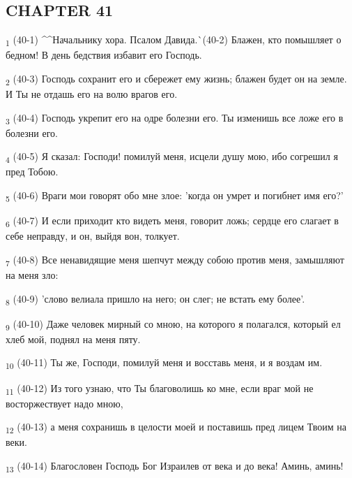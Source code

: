 \subsection{CHAPTER 41}
\begin{tcolorbox}
\textsubscript{1} (40-1) ^^Начальнику хора. Псалом Давида.^^ (40-2) Блажен, кто помышляет о бедном! В день бедствия избавит его Господь.
\end{tcolorbox}
\begin{tcolorbox}
\textsubscript{2} (40-3) Господь сохранит его и сбережет ему жизнь; блажен будет он на земле. И Ты не отдашь его на волю врагов его.
\end{tcolorbox}
\begin{tcolorbox}
\textsubscript{3} (40-4) Господь укрепит его на одре болезни его. Ты изменишь все ложе его в болезни его.
\end{tcolorbox}
\begin{tcolorbox}
\textsubscript{4} (40-5) Я сказал: Господи! помилуй меня, исцели душу мою, ибо согрешил я пред Тобою.
\end{tcolorbox}
\begin{tcolorbox}
\textsubscript{5} (40-6) Враги мои говорят обо мне злое: 'когда он умрет и погибнет имя его?'
\end{tcolorbox}
\begin{tcolorbox}
\textsubscript{6} (40-7) И если приходит кто видеть меня, говорит ложь; сердце его слагает в себе неправду, и он, выйдя вон, толкует.
\end{tcolorbox}
\begin{tcolorbox}
\textsubscript{7} (40-8) Все ненавидящие меня шепчут между собою против меня, замышляют на меня зло:
\end{tcolorbox}
\begin{tcolorbox}
\textsubscript{8} (40-9) 'слово велиала пришло на него; он слег; не встать ему более'.
\end{tcolorbox}
\begin{tcolorbox}
\textsubscript{9} (40-10) Даже человек мирный со мною, на которого я полагался, который ел хлеб мой, поднял на меня пяту.
\end{tcolorbox}
\begin{tcolorbox}
\textsubscript{10} (40-11) Ты же, Господи, помилуй меня и восставь меня, и я воздам им.
\end{tcolorbox}
\begin{tcolorbox}
\textsubscript{11} (40-12) Из того узнаю, что Ты благоволишь ко мне, если враг мой не восторжествует надо мною,
\end{tcolorbox}
\begin{tcolorbox}
\textsubscript{12} (40-13) а меня сохранишь в целости моей и поставишь пред лицем Твоим на веки.
\end{tcolorbox}
\begin{tcolorbox}
\textsubscript{13} (40-14) Благословен Господь Бог Израилев от века и до века! Аминь, аминь!
\end{tcolorbox}
